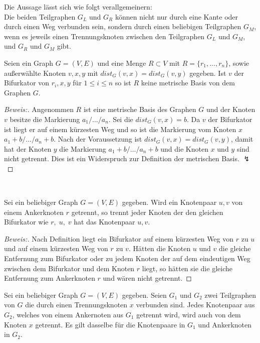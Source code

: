   \begin{bem}
  \label{aussagetrennungsgraphen}
  Die Aussage lässt sich wie folgt verallgemeinern:\\
  Die beiden Teilgraphen $G_L$ und $G_R$ können nicht nur durch eine Kante oder durch einen Weg verbunden sein, sondern durch einen beliebigen Teilgraphen $G_M$, wenn es jeweils einen Trennungsknoten zwischen den Teilgraphen $G_L$ und $G_M$, und $G_R$ und $G_M$ gibt.
  \end{bem}
\begin{lem}
\label{Bifurnachbar}
Seien ein Graph $G=(V,E)$ und eine Menge $R \subset V$ mit $R=\{r_1, \ldots , r_n\}$, sowie außerwählte Knoten $v,x,y$ mit $dist_G(v,x)=dist_G(v,y)$ gegeben. Ist $v$ der Bifurkator von $r_i,x,y$ für $1 \leq i \leq n$ so ist $R$ keine metrische Basis von dem Graphen $G$.
\end{lem}
\begin{proof}[Beweis:]
Angenommen $R$ ist eine metrische Basis des Graphen $G$ und der Knoten $v$ besitze die Markierung $a_1/\ldots /a_n$. Sei die $dist_G(v,x)=b$. Da $v$ der Bifurkator ist liegt er auf einem kürzesten Weg und so ist die Markierung vom Knoten $x$ $a_1+b/\ldots /a_n+b$. Nach der Voraussetzung ist $dist_G(v,x)=dist_G(v,y)$, damit hat der Knoten $y$ die Markierung $a_1+b/\ldots /a_n+b$ und die Knoten $x$ und $y$ sind nicht getrennt. Dies ist ein Widerspruch zur Definition der metrischen Basis. $\lightning$
\end{proof}
~ \linebreak
\vspace{-12mm}
\begin{lem}
\label{bifur}
Sei ein beliebiger Graph $G=(V,E)$ gegeben. Wird ein Knotenpaar $u,v$ von einem Ankerknoten $r$ getrennt, so trennt jeder Knoten der den gleichen Bifurkator wie $r,\;u,\;v$ hat das Knotenpaar $u,v$.
\end{lem}
\begin{proof}[Beweis:]
Nach Definition liegt ein Bifurkator auf einem kürzesten Weg von $r$ zu $u$ und auf einem kürzesten Weg von $r$ zu $v$. Hätten die Knoten $u$ und $v$ die gleiche Entfernung zum Bifurkator oder zu jedem Knoten der auf dem eindeutigen Weg zwischen dem Bifurkator und dem Knoten $r$ liegt, so hätten sie die gleiche Entfernung zum Ankerknoten $r$ und wären nicht getrennt.
\end{proof}
\begin{lem}
\label{trennungsknoten}
Sei ein beliebiger Graph $G=(V,E)$ gegeben. Seien $G_1$ und $G_2$ zwei Teilgraphen von $G$ die durch einen Trennungsknoten $x$ verbunden sind. Jedes Knotenpaar aus $G_2$, welches von einem Ankernoten aus $G_1$ getrennt wird, wird auch von dem Knoten $x$ getrennt. Es gilt dasselbe für die Knotenpaare in $G_1$ und Ankerknoten in $G_2$.
\end{lem}
